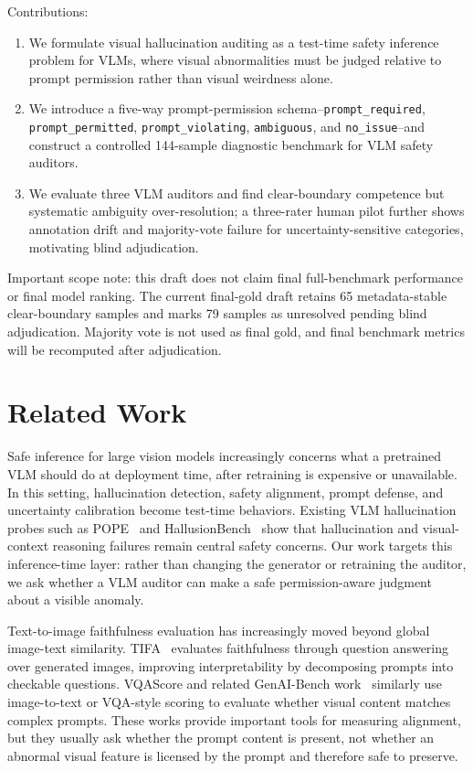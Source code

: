 \documentclass[11pt]{article}
\begin{document}
Contributions:
\begin{enumerate}[leftmargin=*]
\item We formulate visual hallucination auditing as a test-time safety inference problem for VLMs, where visual abnormalities must be judged relative to prompt permission rather than visual weirdness alone.
\item We introduce a five-way prompt-permission schema--\texttt{prompt\_required}, \texttt{prompt\_permitted}, \texttt{prompt\_violating}, \texttt{ambiguous}, and \texttt{no\_issue}--and construct a controlled 144-sample diagnostic benchmark for VLM safety auditors.
\item We evaluate three VLM auditors and find clear-boundary competence but systematic ambiguity over-resolution; a three-rater human pilot further shows annotation drift and majority-vote failure for uncertainty-sensitive categories, motivating blind adjudication.
\end{enumerate}

Important scope note: this draft does not claim final full-benchmark performance or final model ranking. The current final-gold draft retains 65 metadata-stable clear-boundary samples and marks 79 samples as unresolved pending blind adjudication. Majority vote is not used as final gold, and final benchmark metrics will be recomputed after adjudication.

\section{Related Work}

Safe inference for large vision models increasingly concerns what a pretrained VLM should do at deployment time, after retraining is expensive or unavailable. In this setting, hallucination detection, safety alignment, prompt defense, and uncertainty calibration become test-time behaviors. Existing VLM hallucination probes such as POPE~\cite{li2023pope} and HallusionBench~\cite{guan2024hallusionbench} show that hallucination and visual-context reasoning failures remain central safety concerns. Our work targets this inference-time layer: rather than changing the generator or retraining the auditor, we ask whether a VLM auditor can make a safe permission-aware judgment about a visible anomaly.

Text-to-image faithfulness evaluation has increasingly moved beyond global image-text similarity. TIFA~\cite{hu2023tifa} evaluates faithfulness through question answering over generated images, improving interpretability by decomposing prompts into checkable questions. VQAScore and related GenAI-Bench work~\cite{lin2024vqascore} similarly use image-to-text or VQA-style scoring to evaluate whether visual content matches complex prompts. These works provide important tools for measuring alignment, but they usually ask whether the prompt content is present, not whether an abnormal visual feature is licensed by the prompt and therefore safe to preserve.
\end{document}
